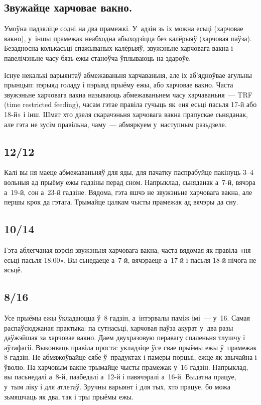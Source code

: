 \subsection{Звужайце харчовае вакно.}
Умоўна падзяліце содні на два прамежкі. У~адзін зь іх можна есьці (харчовае вакно), у~іншы прамежак неабходна абыходзіцца без калёрыяў (харчовая паўза). Безадносна колькасьці спажываных калёрыяў, звужэньне харчовага вакна і павелічэньне часу бязь ежы станоўча ўплываюць на здароўе.


Існуе некалькі варыянтаў абмежаваньня харчаваньня, але іх аб'ядноўвае агульны прынцып: пэрыяд голаду і пэрыяд прыёму ежы, або харчовае вакно. Часта звужэньне харчовага вакна называюць абмежаваньнем часу харчаваньня~--- TRF (time restricted feeding), часам гэтае правіла гучыць як «ня есьці пасьля 17-й або 18-й» і інш. Шмат хто дзеля скарачэньня харчовага вакна прапускае сьняданак, але гэта не зусім правільна, чаму~--- абмяркуем у~наступным разьдзеле.

\subsection{12/12}
Калі вы ня маеце абмежаваньняў для яды, для пачатку паспрабуйце пакінуць 3--4 вольныя ад прыёму ежы гадзіны перад сном. Напрыклад, сьняданак а~7-й, вячэра а~19-й, сон а~23-й гадзіне. Вядома, гэта яшчэ не звужэньне харчовага вакна, але першы крок да гэтага. Трымайце цалкам чысты прамежак ад вячэры да сну.

\subsection{10/14}
Гэта аблегчаная вэрсія звужэньня харчовага вакна, часта вядомая як правіла «ня есьці пасьля 18:00». Вы сьнедаеце а~7-й, вячэраеце а~17-й і пасьля 18-й нічога не ясьцё.

\subsection{8/16}
Усе прыёмы ежы ўкладаюцца ў~8 гадзін, а~інтэрвалы паміж імі~--- у~16. Самая распаўсюджаная практыка: па сутнасьці, харчовая паўза акурат у~два разы даўжэйшая за харчовае вакно. Даем двухразовую перавагу спаленьня тлушчу і аўтафагіі. Выконваць правіла проста: укладзіце ўсе свае прыёмы ежы ў~прамежак 8 гадзін. Не абмяжоўвайце сябе ў~прадуктах і памеры порцыі, ежце як звычайна і ўволю. Па харчовым вакне трымайце чысты прамежак у~16 гадзін. Напрыклад, вы пасьнедалі а~8-й, паабедалі а~12-й і павячэралі а~16-й. Выдатна працуе, у~тым ліку і для атлетаў. Зручны варыянт і для тых, хто працуе, бо можа зьмяшчаць як два, так і тры прыёмы ежы.

